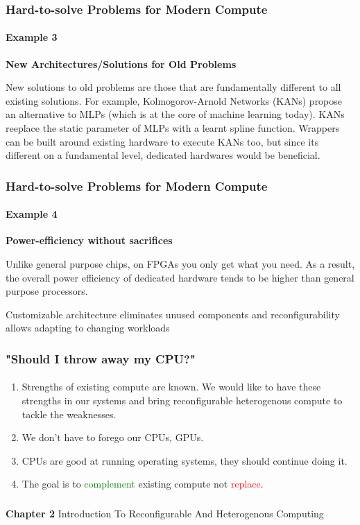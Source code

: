 \documentclass{beamer}
\begin{document}
\begin{frame}[fragile]
  \frametitle{Hard-to-solve Problems for Modern Compute}
  \framesubtitle{Example 3}
  \textbf{New Architectures/Solutions for Old Problems}

  New solutions to old problems are those that are fundamentally different to
  all existing solutions. For example, Kolmogorov-Arnold Networks (KANs) propose
  an alternative to MLPs (which is at the core of machine learning today). KANs
  reeplace the static parameter of MLPs with a learnt spline function. Wrappers
  can be built around existing hardware to execute KANs too, but since its
  different on a fundamental level, dedicated hardwares would be beneficial.

\end{frame}

\begin{frame}[fragile]
  \frametitle{Hard-to-solve Problems for Modern Compute}
  \framesubtitle{Example 4}

  \textbf{Power-efficiency without sacrifices}

  Unlike general purpose chips, on FPGAs you only get what you need. As a
  result, the overall power efficiency of dedicated hardware tends to be
  higher than general purpose processors. 

  Customizable architecture eliminates unused components and reconfigurability
  allows adapting to changing workloads

\end{frame}

\begin{frame}[fragile]
  \frametitle{"Should I throw away my CPU?"}
  \framesubtitle{}
  \begin{enumerate}
    \item Strengths of existing compute are known. We would like
      to have these strengths in our systems and bring reconfigurable
      heterogenous compute to tackle the weaknesses. 
    \item We don't have to forego our CPUs, GPUs.
    \item CPUs are good at running operating systems, they should continue
      doing it. 
    \item The goal is to \textcolor{green}{complement} existing compute not
      \textcolor{red}{replace}.
  \end{enumerate}

\end{frame}

\begin{frame}[c,fragile]
  \frametitle{}

  \centering
  \textbf{Chapter 2}
  \centering
  Introduction To Reconfigurable And Heterogenous Computing
\end{frame}
\end{document}
